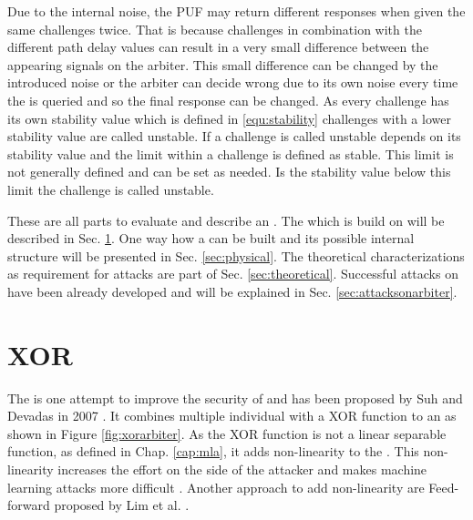 Due to the internal noise, the PUF may return different responses when given the same challenges twice.
That is because challenges in combination with the different path delay values can result in a very small difference between the appearing signals on the arbiter.
This small difference can be changed by the introduced noise or the arbiter can decide wrong due to its own noise every time the \apuf is queried and so the final response can be changed.
As every challenge has its own stability value which is defined in \ref{equ:stability} challenges with a lower stability value are called unstable.
If a challenge is called unstable depends on its stability value and the limit within a challenge is defined as stable.
This limit is not generally defined and can be set as needed.
Is the stability value below this limit the challenge is called unstable.

These are all parts to evaluate and describe an \apuf.
The \xpuf which is build on \apufs will be described in Sec. \ref{sec:xorarbiterpufs}.
One way how a \apuf can be built and its possible internal structure will be presented in Sec. \ref{sec:physical}.
The theoretical characterizations as requirement for attacks are part of Sec. \ref{sec:theoretical}.
Successful attacks on \apufs have been already developed and will be explained in Sec. \ref{sec:attacksonarbiter}.


\section{\acs{XOR} \apufs}
\label{sec:xorarbiterpufs}

The \xpuf is one attempt to improve the security of \apufs and has been proposed by Suh and Devadas in 2007 \cite{Suh2007PhysicalGeneration}.
It combines multiple individual \apufs with a \acf{XOR} function to an \xpuf as shown in Figure \ref{fig:xorarbiter}.
As the \ac{XOR} function is not a linear separable function, as defined in Chap. \ref{cap:mla}, it adds non-linearity to the \puf. 
This non-linearity increases the effort on the side of the attacker and makes machine learning attacks more difficult \cite{Greibach2010OnBifurcation, Lim2005ExtractingCircuits}.
Another approach to add non-linearity are Feed-forward \apufs proposed by Lim et al. \cite{Lim2005ExtractingCircuits}.

